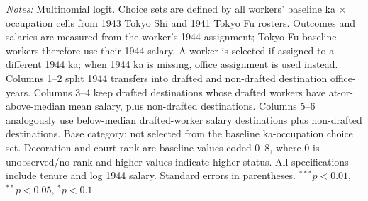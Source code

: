 \begin{table}[htbp]
\begin{threeparttable}
\begin{tablenotes}[flushleft]\footnotesize
\item \textit{Notes:} Multinomial logit. Choice sets are defined by all workers' baseline ka $\times$ occupation cells from 1943 Tokyo Shi and 1941 Tokyo Fu rosters. Outcomes and salaries are measured from the worker's 1944 assignment; Tokyo Fu baseline workers therefore use their 1944 salary. A worker is selected if assigned to a different 1944 ka; when 1944 ka is missing, office assignment is used instead. Columns 1--2 split 1944 transfers into drafted and non-drafted destination office-years. Columns 3--4 keep drafted destinations whose drafted workers have at-or-above-median mean salary, plus non-drafted destinations. Columns 5--6 analogously use below-median drafted-worker salary destinations plus non-drafted destinations. Base category: not selected from the baseline ka-occupation choice set. Decoration and court rank are baseline values coded 0--8, where 0 is unobserved/no rank and higher values indicate higher status. All specifications include tenure and log 1944 salary. Standard errors in parentheses. $^{***}p<0.01$, $^{**}p<0.05$, $^{*}p<0.1$.
\end{tablenotes}\end{threeparttable}\end{table}
